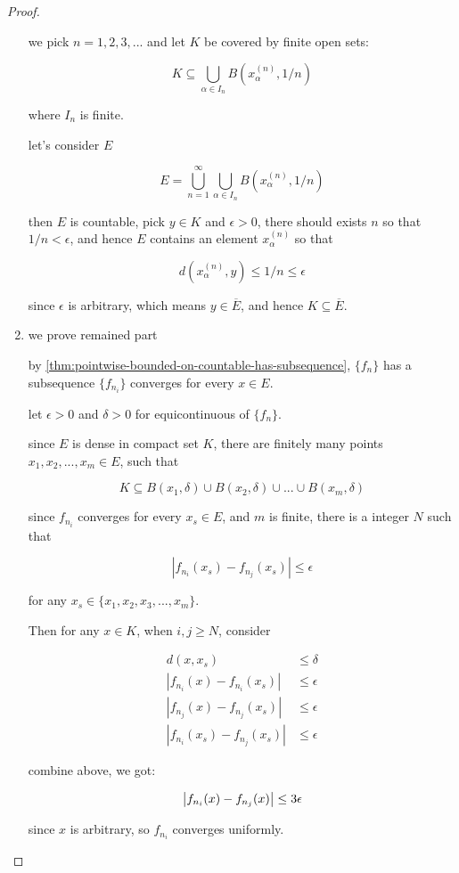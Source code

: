 \begin{proof}
\begin{enumerate}
    we pick $n = 1,2,3,...$ and let $K$ be covered by finite open sets:

    \[
        K \subseteq \bigcup_{\alpha \in I_n} B(x^{(n)}_{\alpha}, 1/n)
    \]

    where $I_n$ is finite.

    let's consider $E$

    \[
        E = \bigcup_{n=1}^{\infty}\bigcup_{\alpha \in I_n} B(x^{(n)}_{\alpha}, 1/n)
    \]

    then $E$ is countable, pick $y \in K$ and $\epsilon > 0$, there should exists $n$
    so that $1/n < \epsilon$, and hence $E$ contains an element $x^{(n)}_{\alpha}$ so that 

    \[
        d(x^{(n)}_{\alpha}, y) \le 1/n \le \epsilon
    \]

    since $\epsilon$ is arbitrary, which means $y \in \overline{E}$, and hence $K \subseteq \overline{E}$.

    \item we prove remained part

    by \autoref{thm:pointwise-bounded-on-countable-has-subsequence}, $\{ f_n\}$
    has a subsequence $\{ f_{n_i}\}$ converges for every $x \in E$.

    let $\epsilon > 0$ and $\delta > 0$ for equicontinuous of $\{ f_n\}$.

    since $E$ is dense in compact set $K$, there are finitely many points $x_1,x_2,...,x_m \in E$, such that

    \[
        K \subseteq B(x_1,\delta) \cup B(x_2, \delta) \cup ... \cup B(x_m, \delta)
    \]

    since $f_{n_i}$ converges for every $x_s \in E$, and $m$ is finite, there is a integer $N$ such that

    \[
        \left| f_{n_i}(x_s) - f_{n_j}(x_s) \right| \le \epsilon
    \]

    for any $x_s \in \{ x_1,x_2,x_3,...,x_m \}$.

    Then for any $x \in K$, when $i,j \ge N$, consider

    \begin{align*}
        d(x, x_s) & \le \delta \\
        \left| f_{n_i}(x) - f_{n_i}(x_s) \right| & \le \epsilon \\
        \left| f_{n_j}(x) - f_{n_j}(x_s) \right| & \le \epsilon \\
        \left| f_{n_i}(x_s) - f_{n_j}(x_s) \right| &\le \epsilon
    \end{align*}

    combine above, we got:

    \[
        \left| f_{n_i}(x) - f_{n_j}(x) \right|  \le 3\epsilon \\
    \]

    since $x$ is arbitrary, so $f_{n_i}$ converges uniformly.

    \end{enumerate}
\end{proof}

